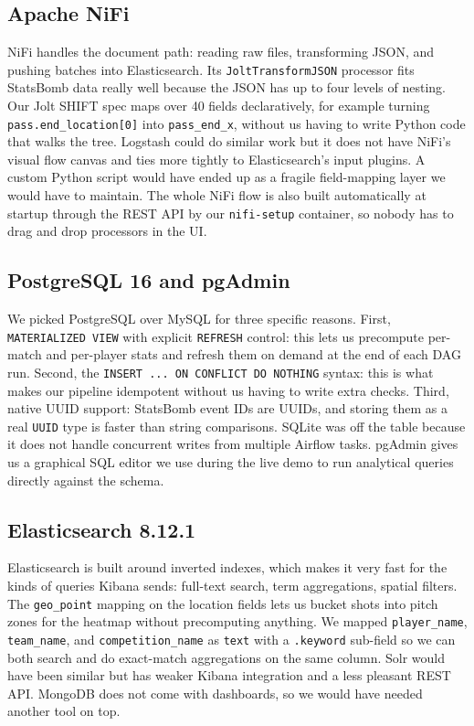 \documentclass[conference]{IEEEtran}
\begin{document}
\subsection{Apache NiFi}

NiFi handles the document path: reading raw files, transforming JSON, and
pushing batches into Elasticsearch. Its \texttt{JoltTransformJSON} processor
fits StatsBomb data really well because the JSON has up to four levels of
nesting. Our Jolt SHIFT spec maps over 40 fields declaratively, for example
turning \texttt{pass.end\_location[0]} into \texttt{pass\_end\_x}, without us
having to write Python code that walks the tree. Logstash could do similar
work but it does not have NiFi's visual flow canvas and ties more tightly to
Elasticsearch's input plugins. A custom Python script would have ended up as
a fragile field-mapping layer we would have to maintain. The whole NiFi flow
is also built automatically at startup through the REST API by our
\texttt{nifi-setup} container, so nobody has to drag and drop processors in
the UI.

\subsection{PostgreSQL 16 and pgAdmin}

We picked PostgreSQL over MySQL for three specific reasons. First,
\texttt{MATERIALIZED VIEW} with explicit \texttt{REFRESH} control: this lets
us precompute per-match and per-player stats and refresh them on demand at
the end of each DAG run. Second, the \texttt{INSERT ... ON CONFLICT DO NOTHING}
syntax: this is what makes our pipeline idempotent without us having to write
extra checks. Third, native UUID support: StatsBomb event IDs are UUIDs, and
storing them as a real \texttt{UUID} type is faster than string comparisons.
SQLite was off the table because it does not handle concurrent writes from
multiple Airflow tasks. pgAdmin gives us a graphical SQL editor we use during
the live demo to run analytical queries directly against the schema.

\subsection{Elasticsearch 8.12.1}

Elasticsearch is built around inverted indexes, which makes it very fast for
the kinds of queries Kibana sends: full-text search, term aggregations,
spatial filters. The \texttt{geo\_point} mapping on the location fields lets
us bucket shots into pitch zones for the heatmap without precomputing
anything. We mapped \texttt{player\_name}, \texttt{team\_name}, and
\texttt{competition\_name} as \texttt{text} with a \texttt{.keyword} sub-field
so we can both search and do exact-match aggregations on the same column.
Solr would have been similar but has weaker Kibana integration and a less
pleasant REST API. MongoDB does not come with dashboards, so we would have
needed another tool on top.
\end{document}
